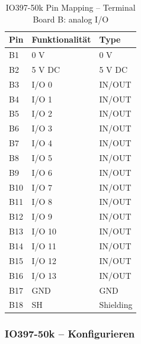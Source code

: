 \pagebreak[1]
\begin{table}[!ht]
	\centering
	\caption{IO397-50k Pin Mapping – Terminal Board B: analog I/O \cite{speedgoat:IO397_50k}}
	\label{IO397_50k:tab:Board_B}
	\begin{tabular}{lll}
		\hline
		\textbf{Pin}             & \textbf{Funktionalität} & \textbf{Type} \\ \hline
		\multicolumn{1}{l|}{B1}  & 0 V                     & 0 V           \\
		\multicolumn{1}{l|}{B2}  & 5 V DC                  & 5 V DC        \\ \hline
		\multicolumn{1}{l|}{B3}  & I/O 0                   & IN/OUT        \\
		\multicolumn{1}{l|}{B4}  & I/O 1                   & IN/OUT        \\
		\multicolumn{1}{l|}{B5}  & I/O 2                   & IN/OUT        \\
		\multicolumn{1}{l|}{B6}  & I/O 3                   & IN/OUT        \\
		\multicolumn{1}{l|}{B7}  & I/O 4                   & IN/OUT        \\
		\multicolumn{1}{l|}{B8}  & I/O 5                   & IN/OUT        \\
		\multicolumn{1}{l|}{B9}  & I/O 6                   & IN/OUT        \\
		\multicolumn{1}{l|}{B10} & I/O 7                   & IN/OUT        \\
		\multicolumn{1}{l|}{B11} & I/O 8                   & IN/OUT        \\
		\multicolumn{1}{l|}{B12} & I/O 9                   & IN/OUT        \\
		\multicolumn{1}{l|}{B13} & I/O 10                  & IN/OUT        \\
		\multicolumn{1}{l|}{B14} & I/O 11                  & IN/OUT        \\
		\multicolumn{1}{l|}{B15} & I/O 12                  & IN/OUT        \\
		\multicolumn{1}{l|}{B16} & I/O 13                  & IN/OUT        \\\hline
		\multicolumn{1}{l|}{B17} & GND                     & GND           \\
		\multicolumn{1}{l|}{B18} & SH                      & Shielding     \\ \hline
	\end{tabular}
\end{table}
\pagebreak[4]


\subsubsection{IO397-50k – Konfigurieren}
\label{Simulink:IO397_50k_Konfigurieren}


